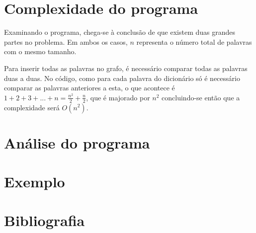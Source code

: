 \documentclass[a4paper, 11pt]{article}
\begin{document}
\section{Complexidade do programa}
    \par Examinando o programa, chega-se à conclusão de que existem duas grandes partes no problema. Em ambos os casos, $n$ representa o número total de palavras com o mesmo tamanho.
    \begin{description}[align=left]
        \item[Criação de grafo] Para inserir todas as palavras no grafo, é necessário comparar todas as palavras duas a duas. No código, como para cada palavra do dicionário só é necessário comparar as palavras anteriores a esta, o que acontece é $1 + 2 + 3 + ... + n = \frac{n^2}{2} + \frac{n}{2}$, que é majorado por $n^2$ concluindo-se então que a complexidade será $O(n^2)$.
        \item[Algorítmo de Dijkstra]  
    \end{description}

\section{Análise do programa}

\section{Exemplo}

\section{Bibliografia}
\end{document}
